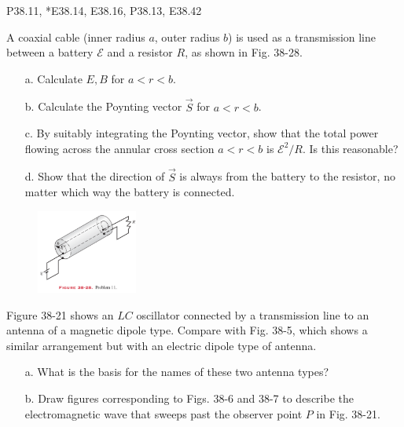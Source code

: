 \documentclass[11pt,letterpaper,boxed]{pset}
\begin{document}
    \begin{center}
        P38.11, *E38.14, E38.16, P38.13, E38.42
    \end{center}
    
    \begin{problem} [P38.11]
        A coaxial cable (inner radius $a$, outer radius $b$) is used as a transmission line between a battery $\mathscr{E}$ and a resistor $R$, as  shown in Fig. 38-28. 
        
        \begin{enumerate}
            \item [a.] Calculate $E, B$ for $a < r < b$.
            \item [b.] Calculate the Poynting vector $\Vec{S}$ for $a < r < b$.
            \item [c.] By suitably integrating the Poynting vector, show that the total power flowing across the annular cross section $a < r < b$ is $\mathscr{E}^2/R$. Is this reasonable?
            \item [d.] Show that the direction of $\Vec{S}$ is always from the battery to the resistor, no matter which way the battery is connected.
        \end{enumerate}
    \end{problem}
    
    \begin{figure} [ht]
        \includegraphics[width = 125px]{HW11Images/P38-11.png}
        \label{fig:P38-11}
    \end{figure}
    \newpage
    
    \begin{problem} [*E38.14]
        Figure 38-21 shows an $LC$ oscillator connected by a transmission line to an antenna of a magnetic dipole type. Compare with Fig. 38-5, which shows a similar arrangement but with an electric dipole type of antenna. 
        
        \begin{enumerate}
            \item [a.] What is the basis for the names of these two antenna types?
            \item [b.] Draw figures corresponding to Figs. 38-6 and 38-7 to describe the electromagnetic wave that sweeps past the observer point $P$ in Fig. 38-21. 
        \end{enumerate}
    \end{problem}
    
\end{document}
